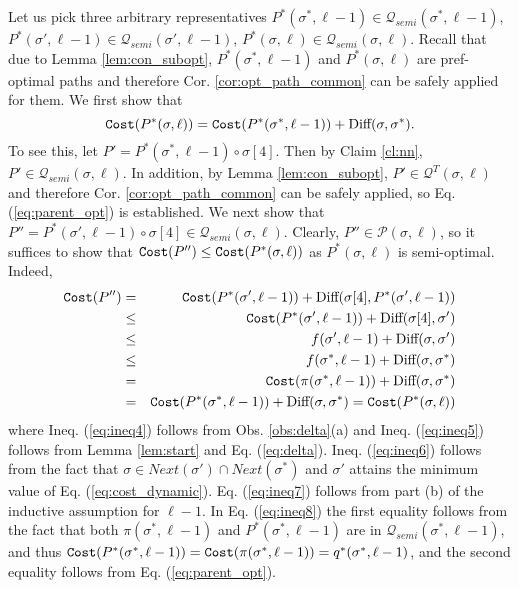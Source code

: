 \documentclass[12pt]{article}
\def\Cost{\mbox{\tt Cost}}
\newcommand{\DIFF}[0]{\mbox{Diff}}
\newcommand{\DegThreeConst}[0]{4}
\def\Cost{\mbox{\tt Cost}}
\begin{document}
Let us pick three arbitrary representatives $P^{*}(\sigma^{*},\ell-1) \in \mathcal{Q}_{semi}(\sigma^{*},\ell-1)$, $P^{*}(\sigma',\ell-1) \in \mathcal{Q}_{semi}(\sigma',\ell-1)$, $P^{*}(\sigma,\ell) \in \mathcal{Q}_{semi}(\sigma,\ell)$. Recall that due to Lemma \ref{lem:con_subopt}, $P^{*}(\sigma^{*},\ell-1)$ and $P^{*}(\sigma,\ell)$ are pref-optimal paths and therefore Cor. \ref{cor:opt_path_common} can be safely applied for them. We first show that \begin{equation}
\label{eq:parent_opt}
\Cost(P^{*}(\sigma,\ell))=\Cost(P^{*}(\sigma^{*},\ell-1))+\DIFF(\sigma,\sigma^{*}).
\end{equation}
To see this, let $P'=P^{*}(\sigma^{*},\ell-1) \circ \sigma[\DegThreeConst]$. Then by Claim \ref{cl:nn}, $P' \in \mathcal{Q}_{semi}(\sigma,\ell)$. In addition, by Lemma \ref{lem:con_subopt}, $P' \in \mathcal{Q}^{T}(\sigma,\ell)$ and therefore Cor. \ref{cor:opt_path_common} can be safely applied, so Eq. (\ref{eq:parent_opt}) is established. We next show that $P''=P^{*}(\sigma',\ell-1) \circ \sigma[\DegThreeConst] \in \mathcal{Q}_{semi}(\sigma,\ell)$.  Clearly, $P'' \in \mathcal{P}(\sigma,\ell)$, so it suffices to show that $\Cost(P'') \leq \Cost(P^{*}(\sigma,\ell))$ as $P^{*}(\sigma,\ell)$ is semi-optimal. Indeed,
\begin{eqnarray}
\Cost(P'') &=& \Cost(P^{*}(\sigma',\ell-1))+\DIFF(\sigma[\DegThreeConst],P^{*}(\sigma',\ell-1)) \nonumber
\\&\leq&
\Cost(P^{*}(\sigma',\ell-1))+\DIFF(\sigma[\DegThreeConst],\sigma') \label{eq:ineq4}
\\&\leq&
f(\sigma',\ell-1)+\DIFF(\sigma,\sigma') \label{eq:ineq5}
\\&\leq &
f(\sigma^{*},\ell-1)+\DIFF(\sigma,\sigma^{*}) \label{eq:ineq6}
\\&=&
\Cost(\pi(\sigma^{*},\ell-1))+\DIFF(\sigma,\sigma^{*}) \label{eq:ineq7}
\\&= &
\Cost(P^{*}(\sigma^{*},\ell-1))+\DIFF(\sigma,\sigma^{*})= \Cost(P^{*}(\sigma,\ell)) \label{eq:ineq8}
\end{eqnarray}
where Ineq. (\ref{eq:ineq4}) follows from Obs. \ref{obs:delta}(a) and Ineq. (\ref{eq:ineq5}) follows from Lemma \ref{lem:start} and Eq. (\ref{eq:delta}). Ineq. (\ref{eq:ineq6}) follows from the fact that $\sigma \in Next(\sigma')\cap Next(\sigma^{*})$ and $\sigma'$ attains the minimum value of Eq. (\ref{eq:cost_dynamic}). Eq. (\ref{eq:ineq7}) follows from part (b) of the inductive assumption for $\ell-1$. In Eq. (\ref{eq:ineq8}) the first equality follows from the fact that both $\pi(\sigma^{*},\ell-1)$ and $P^{*}(\sigma^{*},\ell-1)$ are in $\mathcal{Q}_{semi}(\sigma^{*},\ell-1)$, and thus $\Cost(P^{*}(\sigma^{*},\ell-1))=\Cost(\pi(\sigma^{*},\ell-1))=q^{*}(\sigma^{*},\ell-1)$, and the second equality follows from Eq.  (\ref{eq:parent_opt}).
\end{document}

